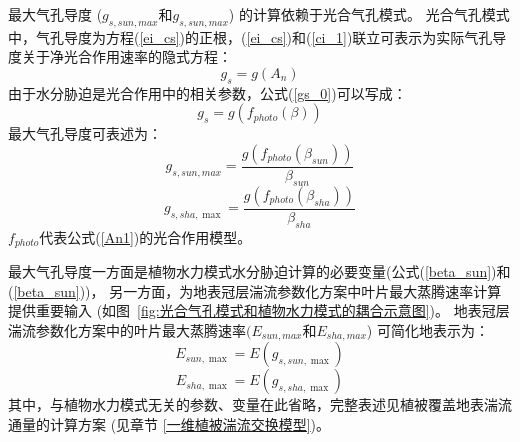 最大气孔导度 ($g_{s,sun,max}$和$g_{s,sun,max}$) 的计算依赖于光合气孔模式。
光合气孔模式中，气孔导度为方程(\ref{ei_cs})的正根，(\ref{ei_cs})和(\ref{ci_1})联立可表示为实际气孔导度关于净光合作用速率的隐式方程：
\begin{equation}\label{gs_0}
g_{s}=g\left(A_{n}\right)
\end{equation}
由于水分胁迫是光合作用中的相关参数，公式(\ref{gs_0})可以写成：
\begin{equation}\label{gs_1}
g_{s}=g\left(f_{photo}(\beta)\right)
\end{equation}
最大气孔导度可表述为：
\begin{equation}\label{gs_sunmax}
g_{s,  { sun,max }}=\frac{g\left(f_{ {photo }}\left(\beta_{ {sun }}\right)\right)}{\beta_{ {sun }}}
\end{equation}
\begin{equation}\label{gs_shamax}
g_{s, sha, \max }=\frac{g\left(f_{photo}\left(\beta_{s h a}\right)\right)}{\beta_{s h a}}
\end{equation}
$f_{photo}$代表公式(\ref{An1})的光合作用模型。


最大气孔导度一方面是植物水力模式水分胁迫计算的必要变量(公式(\ref{beta_sun})和(\ref{beta_sun}))，
另一方面，为地表冠层湍流参数化方案中叶片最大蒸腾速率计算提供重要输入 (如图~\ref{fig:光合气孔模式和植物水力模式的耦合示意图})。
地表冠层湍流参数化方案中的叶片最大蒸腾速率$(E_{sun,max}$和$E_{sha,max}$) 可简化地表示为：
\begin{equation}\label{E_sunmax}
E_{sun, \max }=E\left(g_{s, sun, \max }\right)
\end{equation}
\begin{equation}\label{E_shamax}
E_{sha, \max }=E\left(g_{s, sha, \max }\right)
\end{equation}
其中，与植物水力模式无关的参数、变量在此省略，完整表述见植被覆盖地表湍流通量的计算方案 (见章节 \ref{一维植被湍流交换模型})。


